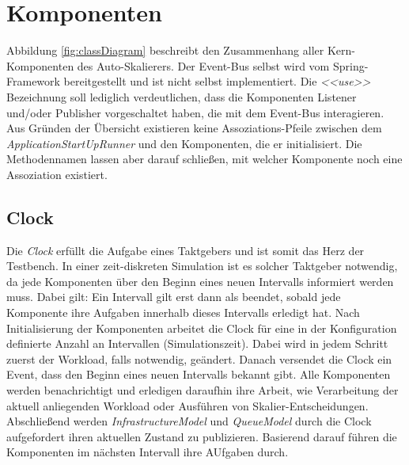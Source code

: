 \section{Komponenten}
Abbildung \ref{fig:classDiagram} beschreibt den Zusammenhang aller Kern-Komponenten des Auto-Skalierers. Der Event-Bus selbst wird vom Spring-Framework bereitgestellt und ist nicht selbst implementiert. Die \textit{<<use>>} Bezeichnung soll lediglich verdeutlichen, dass die Komponenten Listener und/oder Publisher vorgeschaltet haben, die mit dem Event-Bus interagieren. Aus Gründen der Übersicht existieren keine Assoziations-Pfeile zwischen dem \textit{ApplicationStartUpRunner} und den Komponenten, die er initialisiert. Die Methodennamen lassen aber darauf schließen, mit welcher Komponente noch eine Assoziation existiert.

\subsection{Clock}
\label{sec:aufbau:Clock}
Die \textit{Clock} erfüllt die Aufgabe eines Taktgebers und ist somit das Herz der Testbench. In einer zeit-diskreten Simulation ist es solcher Taktgeber notwendig, da jede Komponenten über den Beginn eines neuen Intervalls informiert werden muss. Dabei gilt: Ein Intervall gilt erst dann als beendet, sobald jede Komponente ihre Aufgaben innerhalb dieses Intervalls erledigt hat. Nach Initialisierung der Komponenten arbeitet die Clock für eine in der Konfiguration definierte Anzahl an Intervallen (Simulationszeit). Dabei wird in jedem Schritt zuerst der Workload, falls notwendig, geändert. Danach versendet die Clock ein Event, dass den Beginn eines neuen Intervalls bekannt gibt. Alle Komponenten werden benachrichtigt und erledigen daraufhin ihre Arbeit, wie Verarbeitung der aktuell anliegenden Workload oder Ausführen von Skalier-Entscheidungen. Abschließend werden \textit{InfrastructureModel} und \textit{QueueModel} durch die Clock aufgefordert ihren aktuellen Zustand zu publizieren. Basierend darauf führen die Komponenten im nächsten Intervall ihre AUfgaben durch. 


